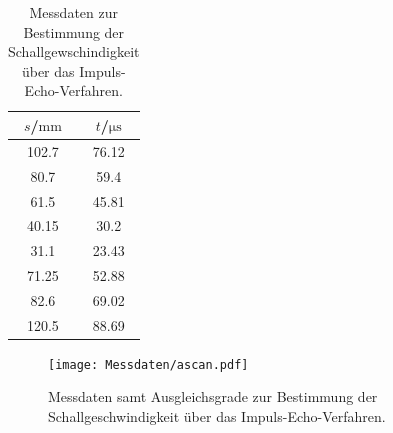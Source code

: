 \begin{table}
  \centering
  \caption{Messdaten zur Bestimmung der Schallgewschindigkeit über das Impuls-Echo-Verfahren.}
  \label{tab:iev}
  \begin{tabular}{cc}
    \toprule
    $s$/$\si{\milli\meter}$ & $t$/$\si{\micro\second}$ \\
    \midrule
    102.7 & 76.12 \\
    80.7 & 59.4 \\
    61.5 & 45.81 \\
    40.15 & 30.2 \\
    31.1 & 23.43 \\
    71.25 & 52.88 \\
    82.6 & 69.02 \\
    120.5 & 88.69 \\
    \bottomrule
  \end{tabular}
\end{table}

\begin{figure}
  \centering
  \texttt{[image: Messdaten/ascan.pdf]}
  \caption{Messdaten samt Ausgleichsgrade zur Bestimmung der Schallgeschwindigkeit über das Impuls-Echo-Verfahren.}
  \label{fig:iev}
\end{figure}
\FloatBarrier

